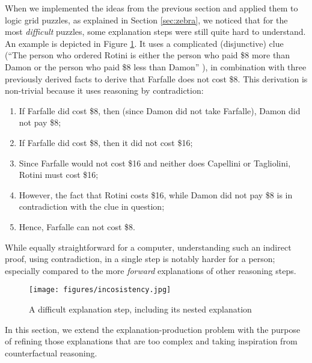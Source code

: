 When we implemented the ideas from the previous section and applied them to logic grid puzzles, as explained in Section \ref{sec:zebra}, we noticed that 
for the most \textit{difficult} puzzles, some explanation steps were still quite hard to understand.
An example is depicted in Figure \ref{fig:pasta_diff}.
It uses a complicated (disjunctive) clue (``The person who ordered Rotini is either the person who paid \$8 more than Damon or the person who paid \$8 less than Damon'' ), in combination with three previously derived facts to derive that Farfalle does not cost \$8.
This derivation is non-trivial because it uses reasoning by contradiction:
 \begin{enumerate}
  \item If Farfalle did cost \$8, then (since Damon did not take Farfalle), Damon did not pay \$8;
  \item If Farfalle did cost \$8, then it did not cost \$16; 
  \item Since Farfalle would not cost \$16 and neither does Capellini or Tagliolini, Rotini must cost \$16;
  \item However, the fact that Rotini costs \$16, while Damon did not pay \$8 is in contradiction with the clue in question;
  \item Hence, Farfalle can not cost \$8.
 \end{enumerate}
 While equally straightforward for a computer, understanding such an indirect proof, using contradiction, in a single step is notably harder for a person; especially compared to the more \textit{forward} explanations of other reasoning steps.
\begin{figure}[t!]
    \texttt{[image: figures/incosistency.jpg]}
    \caption{A difficult explanation step, including its nested explanation}\label{fig:pasta_diff}
\end{figure}

In this section, we extend the explanation-production problem with the purpose of refining those explanations that are too complex and taking inspiration from counterfactual reasoning.

